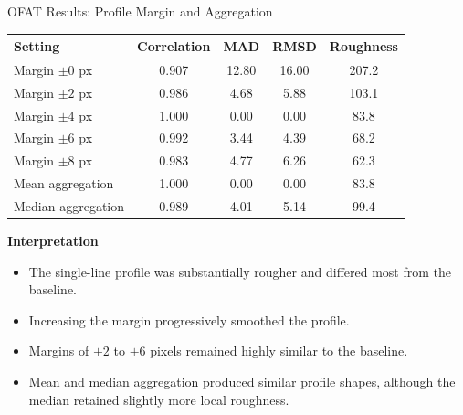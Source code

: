 \documentclass[aspectratio=169]{beamer}
\begin{document}
\begin{frame}{OFAT Results: Profile Margin and Aggregation}

\small

\begin{table}
\centering
\begin{tabular}{lcccc}
\toprule
Setting &
Correlation &
MAD &
RMSD &
Roughness\\
\midrule
Margin $\pm0$ px & 0.907 & 12.80 & 16.00 & 207.2\\
Margin $\pm2$ px & 0.986 & 4.68 & 5.88 & 103.1\\
Margin $\pm4$ px & 1.000 & 0.00 & 0.00 & 83.8\\
Margin $\pm6$ px & 0.992 & 3.44 & 4.39 & 68.2\\
Margin $\pm8$ px & 0.983 & 4.77 & 6.26 & 62.3\\
\midrule
Mean aggregation & 1.000 & 0.00 & 0.00 & 83.8\\
Median aggregation & 0.989 & 4.01 & 5.14 & 99.4\\
\bottomrule
\end{tabular}
\end{table}

\vspace{0.25cm}

\textbf{Interpretation}

\begin{itemize}
    \item The single-line profile was substantially rougher and differed most
    from the baseline.
    \item Increasing the margin progressively smoothed the profile.
    \item Margins of $\pm2$ to $\pm6$ pixels remained highly similar to the
    baseline.
    \item Mean and median aggregation produced similar profile shapes, although
    the median retained slightly more local roughness.
\end{itemize}

\end{frame}
\end{document}
